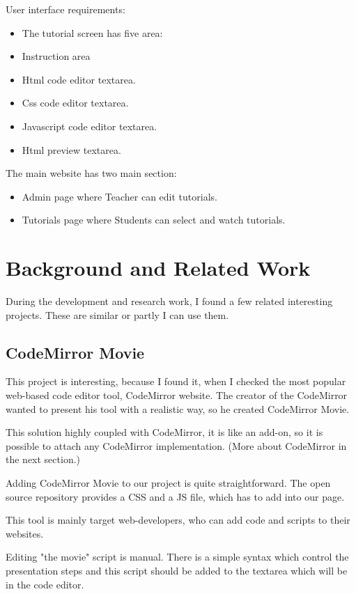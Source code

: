 \documentclass[11pt
              , a4paper
              , twoside
              , openright
              ]{report}
\begin{document}
\noindent User interface requirements:
\begin{itemize}[noitemsep]
\item The tutorial screen has five area:
\item Instruction area
\item Html code editor textarea.
\item Css code editor textarea.
\item Javascript code editor textarea.
\item Html preview textarea.
\end{itemize}

\noindent The main website has two main section:
\begin{itemize}
\item Admin page where Teacher can edit tutorials.
\item Tutorials page where Students can select and watch tutorials.
\end{itemize}

\chapter{Background and Related Work}

During the development and research work, I found a few related interesting projects. These are similar or partly I can use them.

\section{CodeMirror Movie}

This project is interesting, because I found it, when I checked the most popular web-based code editor tool, CodeMirror website. The creator of the CodeMirror wanted to present his tool with a realistic way, so he created CodeMirror Movie. \cite{cm-movie}

This solution highly coupled with CodeMirror, it is like an add-on, so it is possible to attach any CodeMirror implementation. (More about CodeMirror in the next section.)

Adding CodeMirror Movie to our project is quite straightforward. The open source repository provides a CSS and a JS file, which has to add into our page.

This tool is mainly target web-developers, who can add code and scripts to their websites.

Editing "the movie" script is manual. There is a simple syntax which control the presentation steps and this script should be added to the textarea which will be in the code editor.
\end{document}
